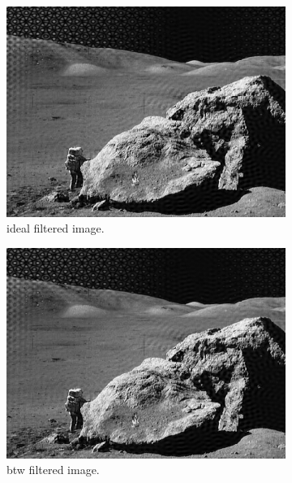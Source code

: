 \documentclass[14pt]{article}
\begin{document}
		\begin{figure}[hbt!]
			\centering
			\begin{subfigure}[b]{0.3\linewidth}
				\includegraphics[width=\linewidth]{ideal_image.png}
				\caption{ideal filtered image.}
			\end{subfigure}
			\begin{subfigure}[b]{0.3\linewidth}
				\includegraphics[width=\linewidth]{btw_image.png}
				\caption{btw filtered image.}
			\end{subfigure}
			\begin{subfigure}[b]{0.3\linewidth}

\end{subfigure}
\end{figure}
\end{document}
